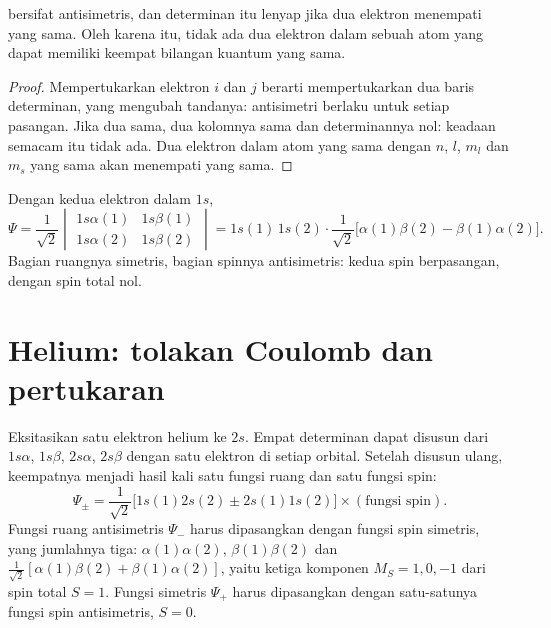 \begin{theorem}\label{thm:b3:many-electron-atoms:pauli}
 bersifat antisimetris, dan determinan itu lenyap jika dua
elektron menempati  yang sama. Oleh karena itu, tidak ada dua
elektron dalam sebuah atom yang dapat memiliki keempat bilangan kuantum yang
sama.
\end{theorem}

\begin{proof}
Mempertukarkan elektron $i$ dan $j$ berarti mempertukarkan dua baris
determinan, yang mengubah tandanya: antisimetri berlaku untuk setiap pasangan.
Jika dua  sama, dua kolomnya sama dan determinannya nol: keadaan
semacam itu tidak ada. Dua elektron dalam atom yang sama dengan $n$, $l$,
$m_l$ dan $m_s$ yang sama akan menempati  yang sama.
\end{proof}

\begin{example}\label{ex:b3:many-electron-atoms:helium-ground}
Dengan kedua elektron dalam $1s$,
\[
\Psi = \frac{1}{\sqrt2}\begin{vmatrix}1s\alpha(1) & 1s\beta(1)\\ 1s\alpha(2) &
1s\beta(2)\end{vmatrix} = 1s(1)\,1s(2)\cdot\frac{1}{\sqrt2}\big[\alpha(1)\beta(2)
- \beta(1)\alpha(2)\big].
\]
Bagian ruangnya simetris, bagian spinnya antisimetris: kedua spin
berpasangan, dengan spin total nol.
\end{example}

\section{Helium: tolakan Coulomb dan pertukaran}

Eksitasikan satu elektron helium ke $2s$. Empat determinan dapat disusun
dari $1s\alpha$, $1s\beta$, $2s\alpha$, $2s\beta$ dengan satu elektron di setiap
orbital. Setelah disusun ulang, keempatnya menjadi hasil kali satu fungsi
ruang dan satu fungsi spin:
\[
\Psi_\pm = \frac{1}{\sqrt2}\big[1s(1)2s(2) \pm 2s(1)1s(2)\big]\times(\text{fungsi
spin}).
\]
Fungsi ruang antisimetris $\Psi_-$ harus dipasangkan dengan fungsi spin
simetris, yang jumlahnya tiga: $\alpha(1)\alpha(2)$,
$\beta(1)\beta(2)$ dan $\frac{1}{\sqrt2}[\alpha(1)\beta(2) + \beta(1)\alpha(2)]$,
yaitu ketiga komponen $M_S = 1, 0, -1$ dari spin total $S = 1$. Fungsi
simetris $\Psi_+$ harus dipasangkan dengan satu-satunya fungsi spin
antisimetris, $S = 0$.

